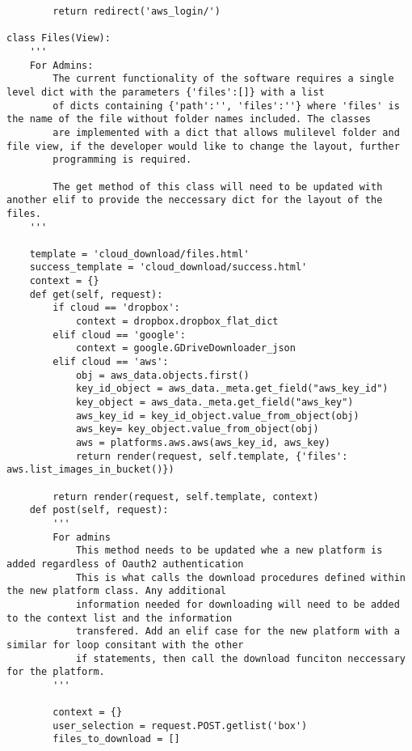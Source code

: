 \documentclass{article}
\begin{document}
\begin{verbatim}
        return redirect('aws_login/')

class Files(View):
    '''
    For Admins:
        The current functionality of the software requires a single level dict with the parameters {'files':[]} with a list
        of dicts containing {'path':'', 'files':''} where 'files' is the name of the file without folder names included. The classes
        are implemented with a dict that allows mulilevel folder and file view, if the developer would like to change the layout, further 
        programming is required.

        The get method of this class will need to be updated with another elif to provide the neccessary dict for the layout of the files.
    '''
    
    template = 'cloud_download/files.html'
    success_template = 'cloud_download/success.html'
    context = {}
    def get(self, request):
        if cloud == 'dropbox':  
            context = dropbox.dropbox_flat_dict 
        elif cloud == 'google':
            context = google.GDriveDownloader_json
        elif cloud == 'aws':
            obj = aws_data.objects.first()
            key_id_object = aws_data._meta.get_field("aws_key_id")
            key_object = aws_data._meta.get_field("aws_key")
            aws_key_id = key_id_object.value_from_object(obj)
            aws_key= key_object.value_from_object(obj)
            aws = platforms.aws.aws(aws_key_id, aws_key)
            return render(request, self.template, {'files': aws.list_images_in_bucket()})

        return render(request, self.template, context)
    def post(self, request):
        '''
        For admins
            This method needs to be updated whe a new platform is added regardless of Oauth2 authentication 
            This is what calls the download procedures defined within the new platform class. Any additional
            information needed for downloading will need to be added to the context list and the information
            transfered. Add an elif case for the new platform with a similar for loop consitant with the other
            if statements, then call the download funciton neccessary for the platform.
        '''
        
        context = {}
        user_selection = request.POST.getlist('box')
        files_to_download = []
        

\end{verbatim}
\end{document}
